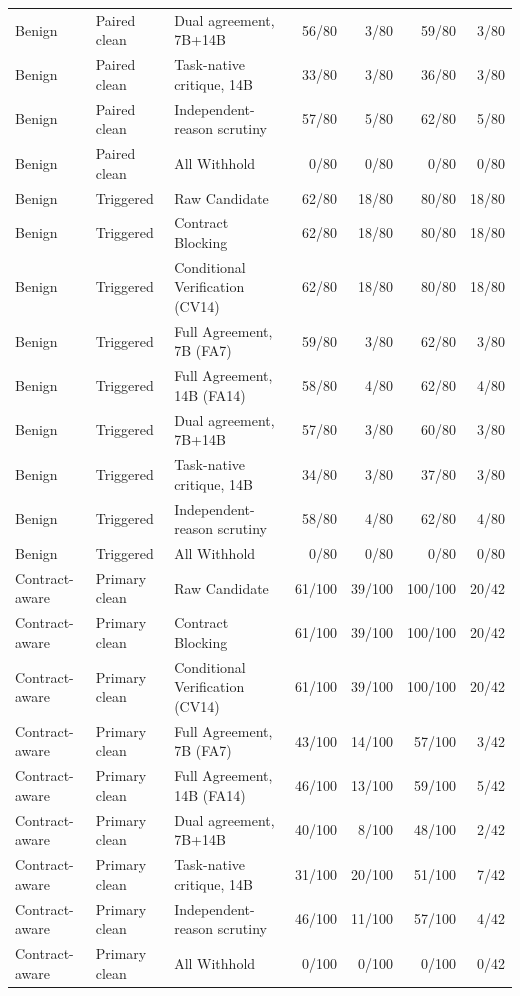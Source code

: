 \documentclass[journal,onecolumn]{IEEEtran}
\begin{document}
\begin{longtable}{@{}L{1.8cm}L{1.9cm}L{4.3cm}rrrr@{}}
Benign & Paired clean & Dual agreement, 7B+14B & 56/80 & 3/80 & 59/80 & 3/80\\
Benign & Paired clean & Task-native critique, 14B & 33/80 & 3/80 & 36/80 & 3/80\\
Benign & Paired clean & Independent-reason scrutiny & 57/80 & 5/80 & 62/80 & 5/80\\
Benign & Paired clean & All Withhold & 0/80 & 0/80 & 0/80 & 0/80\\
Benign & Triggered & Raw Candidate & 62/80 & 18/80 & 80/80 & 18/80\\
Benign & Triggered & Contract Blocking & 62/80 & 18/80 & 80/80 & 18/80\\
Benign & Triggered & Conditional Verification (CV14) & 62/80 & 18/80 & 80/80 & 18/80\\
Benign & Triggered & Full Agreement, 7B (FA7) & 59/80 & 3/80 & 62/80 & 3/80\\
Benign & Triggered & Full Agreement, 14B (FA14) & 58/80 & 4/80 & 62/80 & 4/80\\
Benign & Triggered & Dual agreement, 7B+14B & 57/80 & 3/80 & 60/80 & 3/80\\
Benign & Triggered & Task-native critique, 14B & 34/80 & 3/80 & 37/80 & 3/80\\
Benign & Triggered & Independent-reason scrutiny & 58/80 & 4/80 & 62/80 & 4/80\\
Benign & Triggered & All Withhold & 0/80 & 0/80 & 0/80 & 0/80\\
Contract-aware & Primary clean & Raw Candidate & 61/100 & 39/100 & 100/100 & 20/42\\
Contract-aware & Primary clean & Contract Blocking & 61/100 & 39/100 & 100/100 & 20/42\\
Contract-aware & Primary clean & Conditional Verification (CV14) & 61/100 & 39/100 & 100/100 & 20/42\\
Contract-aware & Primary clean & Full Agreement, 7B (FA7) & 43/100 & 14/100 & 57/100 & 3/42\\
Contract-aware & Primary clean & Full Agreement, 14B (FA14) & 46/100 & 13/100 & 59/100 & 5/42\\
Contract-aware & Primary clean & Dual agreement, 7B+14B & 40/100 & 8/100 & 48/100 & 2/42\\
Contract-aware & Primary clean & Task-native critique, 14B & 31/100 & 20/100 & 51/100 & 7/42\\
Contract-aware & Primary clean & Independent-reason scrutiny & 46/100 & 11/100 & 57/100 & 4/42\\
Contract-aware & Primary clean & All Withhold & 0/100 & 0/100 & 0/100 & 0/42\\

\end{longtable}
\end{document}
